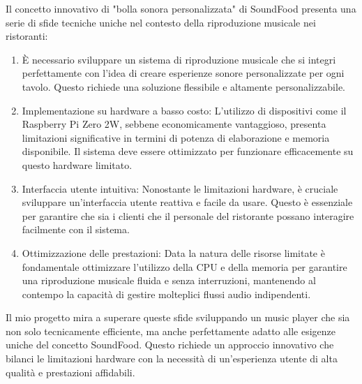 Il concetto innovativo di "bolla sonora personalizzata" di SoundFood presenta una serie di sfide tecniche uniche nel contesto della riproduzione musicale nei ristoranti:
\begin{enumerate}
\item È necessario sviluppare un sistema di riproduzione musicale che si integri perfettamente con l'idea di creare esperienze sonore personalizzate per ogni tavolo. Questo richiede una soluzione flessibile e altamente personalizzabile.
\item Implementazione su hardware a basso costo: L'utilizzo di dispositivi come il Raspberry Pi Zero 2W, sebbene economicamente vantaggioso, presenta limitazioni significative in termini di potenza di elaborazione e memoria disponibile. Il sistema deve essere ottimizzato per funzionare efficacemente su questo hardware limitato.
\item Interfaccia utente intuitiva: Nonostante le limitazioni hardware, è cruciale sviluppare un'interfaccia utente reattiva e facile da usare. Questo è essenziale per garantire che sia i clienti che il personale del ristorante possano interagire facilmente con il sistema.
\item Ottimizzazione delle prestazioni: Data la natura delle risorse limitate è fondamentale ottimizzare l'utilizzo della CPU e della memoria per garantire una riproduzione musicale fluida e senza interruzioni, mantenendo al contempo la capacità di gestire molteplici flussi audio indipendenti.
\end{enumerate}

Il mio progetto mira a superare queste sfide sviluppando un music player che sia non solo tecnicamente efficiente, ma anche perfettamente adatto alle esigenze uniche del concetto SoundFood. Questo richiede un approccio innovativo che bilanci le limitazioni hardware con la necessità di un'esperienza utente di alta qualità e prestazioni affidabili.
